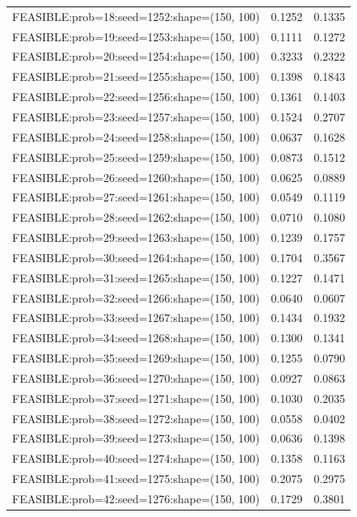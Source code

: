 \begin{longtable}{lcc}
FEASIBLE:prob=18:seed=1252:shape=(150, 100)  &   0.1252 & 0.1335 \\
FEASIBLE:prob=19:seed=1253:shape=(150, 100)  &   0.1111 & 0.1272 \\
FEASIBLE:prob=20:seed=1254:shape=(150, 100)  &   0.3233 & 0.2322 \\
FEASIBLE:prob=21:seed=1255:shape=(150, 100)  &   0.1398 & 0.1843 \\
FEASIBLE:prob=22:seed=1256:shape=(150, 100)  &   0.1361 & 0.1403 \\
FEASIBLE:prob=23:seed=1257:shape=(150, 100)  &   0.1524 & 0.2707 \\
FEASIBLE:prob=24:seed=1258:shape=(150, 100)  &   0.0637 & 0.1628 \\
FEASIBLE:prob=25:seed=1259:shape=(150, 100)  &   0.0873 & 0.1512 \\
FEASIBLE:prob=26:seed=1260:shape=(150, 100)  &   0.0625 & 0.0889 \\
FEASIBLE:prob=27:seed=1261:shape=(150, 100)  &   0.0549 & 0.1119 \\
FEASIBLE:prob=28:seed=1262:shape=(150, 100)  &   0.0710 & 0.1080 \\
FEASIBLE:prob=29:seed=1263:shape=(150, 100)  &   0.1239 & 0.1757 \\
FEASIBLE:prob=30:seed=1264:shape=(150, 100)  &   0.1704 & 0.3567 \\
FEASIBLE:prob=31:seed=1265:shape=(150, 100)  &   0.1227 & 0.1471 \\
FEASIBLE:prob=32:seed=1266:shape=(150, 100)  &   0.0640 & 0.0607 \\
FEASIBLE:prob=33:seed=1267:shape=(150, 100)  &   0.1434 & 0.1932 \\
FEASIBLE:prob=34:seed=1268:shape=(150, 100)  &   0.1300 & 0.1341 \\
FEASIBLE:prob=35:seed=1269:shape=(150, 100)  &   0.1255 & 0.0790 \\
FEASIBLE:prob=36:seed=1270:shape=(150, 100)  &   0.0927 & 0.0863 \\
FEASIBLE:prob=37:seed=1271:shape=(150, 100)  &   0.1030 & 0.2035 \\
FEASIBLE:prob=38:seed=1272:shape=(150, 100)  &   0.0558 & 0.0402 \\
FEASIBLE:prob=39:seed=1273:shape=(150, 100)  &   0.0636 & 0.1398 \\
FEASIBLE:prob=40:seed=1274:shape=(150, 100)  &   0.1358 & 0.1163 \\
FEASIBLE:prob=41:seed=1275:shape=(150, 100)  &   0.2075 & 0.2975 \\
FEASIBLE:prob=42:seed=1276:shape=(150, 100)  &   0.1729 & 0.3801 \\

\end{longtable}
